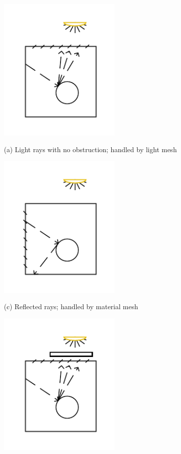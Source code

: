 \begin{figure}[!htb]
  \includegraphics[width=6cm]{drawings/Case_1.pdf}
  
  (a) Light rays with no obstruction; handled by light mesh
  
  \includegraphics[width=6cm]{drawings/Case_3.pdf}
  
  (c) Reflected rays; handled by material mesh
  
\endminipage\hfill
{}
  \includegraphics[width=6cm]{drawings/Case_2.pdf}
  

\end{figure}
